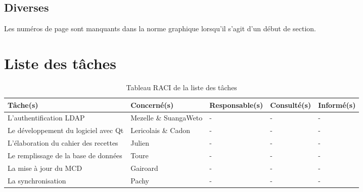 \documentclass[11pt,fleqn]{report}
\begin{document}
\subsection{Diverses}

Les numéros de page sont manquants dans la norme graphique lorsqu'il s'agit d'un début de section.


\newpage
\section{Liste des tâches}

\begin{table}[h]
	\begin{tabularx}{\linewidth}{X X X X X}
		\toprule
	\textbf{Tâche(s)} &	\textbf{Concerné(s)} & \textbf{Responsable(s)} & \textbf{Consulté(s)} & \textbf{Informé(s)} \\
		\midrule
	L'authentification LDAP &	Mezelle \& SuangaWeto  & - & - & - \\
	    \midrule 
	Le développement du logiciel avec Qt & Lericolais \& Cadon & - & -  & - \\
	\midrule
	L'élaboration du cahier des recettes  & Julien & - & -  & - \\
	\midrule
	Le remplissage de la base de données  & Toure & - & -  & - \\
	\midrule	
	La mise à jour du MCD & Gairoard & - & -  & - \\
	\midrule	
	La synchronisation& Pachy & - & -  & - \\
	\midrule
	\end{tabularx}
	\caption{Tableau RACI de la liste des tâches}
\end{table}

\end{document}
